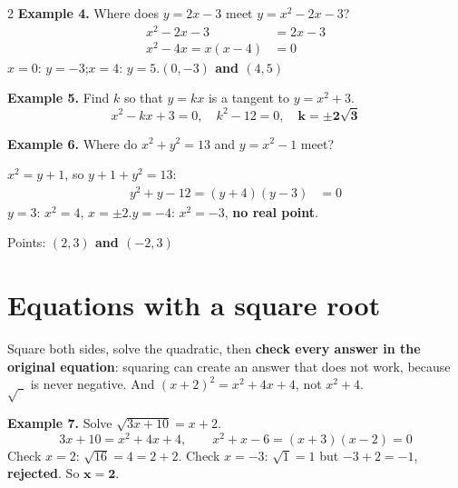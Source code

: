 \documentclass[11pt]{article}
\begin{document}
\begin{multicols}{2}
\textbf{Example 4.} Where does $y = 2x - 3$ meet $y = x^{2} - 2x - 3$?
\begin{align*}
x^{2} - 2x - 3 &= 2x - 3\\
x^{2} - 4x = x(x - 4) &= 0
\end{align*}
$x = 0$: $y = -3$;\quad $x = 4$: $y = 5$.\quad \textbf{$(0,-3)$ and $(4,5)$} 

\textbf{Example 5.} Find $k$ so that $y = kx$ is a tangent to $y = x^{2} + 3$.
\[ x^{2} - kx + 3 = 0,\quad k^{2} - 12 = 0,\quad \mathbf{k = \pm 2\sqrt{3}} \]
\columnbreak

\textbf{Example 6.} Where do $x^{2} + y^{2} = 13$ and $y = x^{2} - 1$ meet?\par
$x^{2} = y + 1$, so $y + 1 + y^{2} = 13$:
\begin{align*}
y^{2} + y - 12 = (y+4)(y-3) &= 0
\end{align*}
$y = 3$: $x^{2} = 4$, $x = \pm 2$.\quad $y = -4$: $x^{2} = -3$, \textbf{no real point}.\par
Points: \textbf{$(2, 3)$ and $(-2, 3)$} 
\end{multicols}

\section{Equations with a square root}\label{h4:surd}
Square both sides, solve the quadratic, then \textbf{check every answer in the original equation}: squaring can create an answer that does not work, because $\sqrt{\ \ }$ is never negative. And $(x+2)^{2} = x^{2} + 4x + 4$, not $x^{2} + 4$.

\textbf{Example 7.} Solve $\sqrt{3x + 10} = x + 2$.
\[ 3x + 10 = x^{2} + 4x + 4,\qquad x^{2} + x - 6 = (x+3)(x-2) = 0 \]
Check $x = 2$: $\sqrt{16} = 4 = 2 + 2$. \quad Check $x = -3$: $\sqrt{1} = 1$ but $-3 + 2 = -1$, \textbf{rejected}. So $\mathbf{x = 2}$. 

\end{document}
